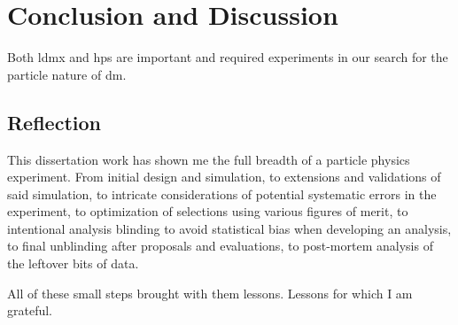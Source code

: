 \chapter{Conclusion and Discussion}
\label{chapter:conclusion}

Both \ac{ldmx} and \ac{hps} are important and required experiments in our search
for the particle nature of \ac{dm}.


\section{Reflection}
This dissertation work has shown me the full breadth of a particle physics experiment.
From initial design and simulation, to extensions and validations of said simulation,
to intricate considerations of potential systematic errors in the experiment,
to optimization of selections using various figures of merit,
to intentional analysis blinding to avoid statistical bias when developing an analysis,
to final unblinding after proposals and evaluations,
to post-mortem analysis of the leftover bits of data.

All of these small steps brought with them lessons.
Lessons for which I am grateful.
